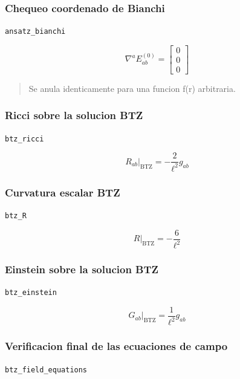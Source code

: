 \documentclass[11pt,a4paper]{article}
\begin{document}
\subsubsection{Chequeo coordenado de Bianchi}

\noindent\texttt{ansatz\_bianchi}\par\nopagebreak[4]

\[
\nabla^aE^{(0)}_{ab} = \left[\begin{matrix}0\\0\\0\end{matrix}\right]
\]

\begin{quote}\small Se anula identicamente para una funcion f(r) arbitraria.\end{quote}

\subsubsection{Ricci sobre la solucion BTZ}

\noindent\texttt{btz\_ricci}\par\nopagebreak[4]

\[
R_{ab}\big|_{\mathrm{BTZ}} = -\frac{2}{\ell^2}g_{ab}
\]

\subsubsection{Curvatura escalar BTZ}

\noindent\texttt{btz\_R}\par\nopagebreak[4]

\[
R\big|_{\mathrm{BTZ}} = - \frac{6}{\ell^{2}}
\]

\subsubsection{Einstein sobre la solucion BTZ}

\noindent\texttt{btz\_einstein}\par\nopagebreak[4]

\[
G_{ab}\big|_{\mathrm{BTZ}} = \frac{1}{\ell^2}g_{ab}
\]

\subsubsection{Verificacion final de las ecuaciones de campo}

\noindent\texttt{btz\_field\_equations}\par\nopagebreak[4]
\end{document}
